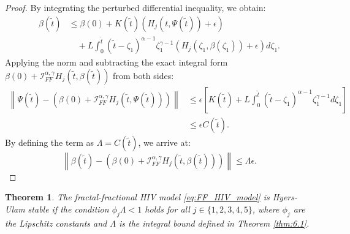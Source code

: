 \documentclass[10pt,a4paper]{amsart}
\newtheorem{theorem}{Theorem}[section]
\numberwithin{equation}{section}
\begin{document}
\begin{proof}
By integrating the perturbed differential inequality, we obtain:
\begin{align*}
    \beta(\tilde{t}) &\leq \beta(0) + K(\tilde{t}) (H_j(t, \Psi(\tilde{t})) + \epsilon) \\
    &\quad + L \int_0^{\tilde{t}} (\tilde{t}-\zeta_1)^{\alpha-1} \zeta_1^{\gamma-1} (H_j(\zeta_1, \beta(\zeta_1)) + \epsilon) d\zeta_1.
\end{align*}
Applying the norm and subtracting the exact integral form $\beta(0) + \mathcal{I}_{FF}^{\alpha, \gamma} H_j(\tilde{t}, \beta(\tilde{t}))$ from both sides:
\begin{align*}
    \left\| \Psi(\tilde{t}) - \left( \beta(0) + \mathcal{I}_{FF}^{\alpha, \gamma} H_j(\tilde{t}, \Psi(\tilde{t})) \right) \right\| &\leq \epsilon \left[ K(\tilde{t}) + L \int_0^{\tilde{t}} (\tilde{t}-\zeta_1)^{\alpha-1} \zeta_1^{\gamma-1} d\zeta_1 \right] \\
    &\leq \epsilon C(\tilde{t}).
\end{align*}
By defining the term as $\Lambda = C(\tilde{t})$, we arrive at:
\begin{equation*}
    \left\| \beta(\tilde{t}) - \left( \beta(0) + \mathcal{I}_{FF}^{\alpha, \gamma} H_j(\tilde{t}, \beta(\tilde{t})) \right) \right\| \leq \Lambda \epsilon.
\end{equation*}
\end{proof}

\begin{theorem}
	The fractal-fractional HIV model \eqref{eq:FF_HIV_model} is Hyers-Ulam stable if the condition $\phi_j \Lambda < 1$ holds for all $j \in \{1, 2, 3, 4, 5\}$, where $\phi_j$ are the Lipschitz constants and $\Lambda$ is the integral bound defined in Theorem \ref{thm:6.1}.
\end{theorem}
\end{document}
